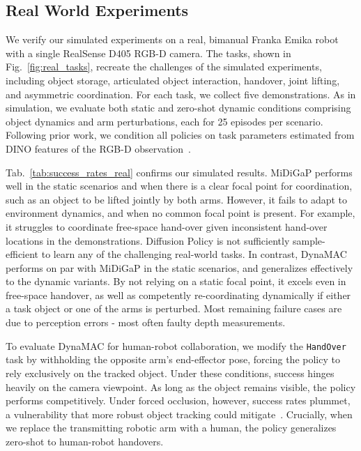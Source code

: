 \documentclass[letterpaper, 10 pt, journal, twoside]{IEEEtran}
\renewcommand{\figref}[1]{Fig.~\ref{#1}}
\newcommand{\tabref}[1]{Tab.~\ref{#1}}
\newcommand{\ourmethod}{DynaMAC\xspace}
\begin{document}
\subsection{Real World Experiments}\label{sec:exp_real}
%
We verify our simulated experiments on a real, bimanual Franka Emika robot with a single RealSense D405 RGB-D camera.
The tasks, shown in \figref{fig:real_tasks}, recreate the challenges of the simulated experiments, including object storage, articulated object interaction, handover, joint lifting, and asymmetric coordination.
For each task, we collect five demonstrations.
As in simulation, we evaluate both static and zero-shot dynamic conditions comprising object dynamics and arm perturbations, each for 25 episodes per scenario.
Following prior work, we condition all policies on task parameters estimated from DINO features of the RGB-D observation~\cite{von2024art, von2025unreasonable}.

\tabref{tab:success_rates_real} confirms our simulated results.
MiDiGaP performs well in the static scenarios and when there is a clear focal point for coordination, such as an object to be lifted jointly by both arms.
However, it fails to adapt to environment dynamics, and when no common focal point is present.
For example, it struggles to coordinate free-space hand-over given inconsistent hand-over locations in the demonstrations.
%
Diffusion Policy is not sufficiently sample-efficient to learn any of the challenging real-world tasks.
In contrast, \ourmethod{} performs on par with MiDiGaP in the static scenarios, and generalizes effectively to the dynamic variants.
By not relying on a static focal point, it excels even in free-space handover, as well as competently re-coordinating dynamically if either a task object or one of the arms is perturbed.
Most remaining failure cases are due to perception errors - most often faulty depth measurements.

%
%
%
%
%
%
To evaluate \ourmethod{} for human-robot collaboration, we modify the \texttt{HandOver} task by withholding the opposite arm's end-effector pose, forcing the policy to rely exclusively on the tracked object.
Under these conditions, success hinges heavily on the camera viewpoint.
As long as the object remains visible, the policy performs competitively.
Under forced occlusion, however, success rates plummet, a vulnerability that more robust object tracking could mitigate~\cite{vonhartz2023treachery}.
Crucially, when we replace the transmitting robotic arm with a human, the policy generalizes zero-shot to human-robot handovers. 
%
\end{document}
